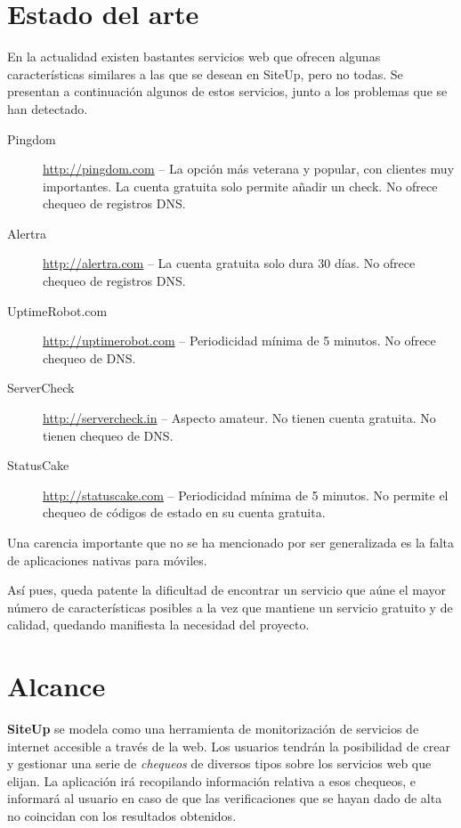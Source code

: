 \section{Estado del arte}
\label{sec:estado-del-arte}

En la actualidad existen bastantes servicios web que ofrecen algunas
características similares a las que se desean en SiteUp, pero no todas. Se
presentan a continuación algunos de estos servicios, junto a los problemas que
se han detectado.

\begin{description}
\item[Pingdom] \url{http://pingdom.com} -- La opción más veterana y popular, con
  clientes muy importantes. La cuenta gratuita solo permite añadir un check. No
  ofrece chequeo de registros DNS.
\item[Alertra] \url{http://alertra.com} -- La cuenta gratuita solo dura 30
  días. No ofrece chequeo de registros DNS.
\item[UptimeRobot.com] \url{http://uptimerobot.com} -- Periodicidad mínima de 5
  minutos. No ofrece chequeo de DNS.
\item[ServerCheck] \url{http://servercheck.in} -- Aspecto amateur. No tienen
  cuenta gratuita. No tienen chequeo de DNS.
\item[StatusCake] \url{http://statuscake.com} -- Periodicidad mínima de 5
  minutos. No permite el chequeo de códigos de estado en su cuenta gratuita.

\end{description}

Una carencia importante que no se ha mencionado por ser generalizada es la falta
de aplicaciones nativas para móviles. 

Así pues, queda patente la dificultad de encontrar un servicio que aúne el mayor
número de características posibles a la vez que mantiene un servicio gratuito y
de calidad, quedando manifiesta la necesidad del proyecto.


\section{Alcance}
\textbf{SiteUp} se modela como una herramienta de monitorización de servicios de
internet accesible a través de la web. Los usuarios tendrán la posibilidad de
crear y gestionar una serie de \textit{chequeos} de diversos tipos sobre los
servicios web que elijan. La aplicación irá recopilando información relativa a
esos chequeos, e informará al usuario en caso de que las verificaciones que se
hayan dado de alta no coincidan con los resultados obtenidos.

